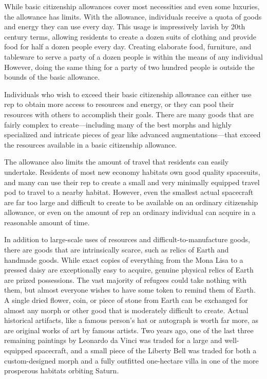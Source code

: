 While basic citizenship allowances cover most necessities
and even some luxuries, the allowance has limits.
With the allowance, individuals receive a quota of 
goods and energy they can use every day. This usage 
is impressively lavish by 20th century terms, allowing 
residents to create a dozen suits of clothing and provide
food for half a dozen people every day. Creating
elaborate food, furniture, and tableware to serve a 
party of a dozen people is within the means of any individual
However, doing the same thing for a party of
two hundred people is outside the bounds of the basic 
allowance.

Individuals who wish to exceed their basic citizenship
allowance can either use rep to obtain more
access to resources and energy, or they can pool 
their resources with others to accomplish their goals. 
There are many goods that are fairly complex to 
create—including many of the best morphs and highly 
specialized and intricate pieces of gear like advanced 
augmentations—that exceed the resources available in 
a basic citizenship allowance.

The allowance also limits the amount of travel that 
residents can easily undertake. Residents of most new 
economy habitats own good quality spacesuits, and 
many can use their rep to create a small and very 
minimally equipped travel pod to travel to a nearby 
habitat. However, even the smallest actual spacecraft 
are far too large and difficult to create to be available 
on an ordinary citizenship allowance, or even on the 
amount of rep an ordinary individual can acquire in a 
reasonable amount of time.

In addition to large-scale uses of resources and 
difficult-to-manufacture goods, there are goods that 
are intrinsically scarce, such as relics of Earth and 
handmade goods. While exact copies of everything 
from the Mona Lisa to a pressed daisy are exceptionally
easy to acquire, genuine physical relics of Earth
are prized possessions. The vast majority of refugees 
could take nothing with them, but almost everyone 
wishes to have some token to remind them of Earth. A 
single dried flower, coin, or piece of stone from Earth 
can be exchanged for almost any morph or other 
good that is moderately difficult to create. Actual 
historical artifacts, like a famous person's hat or autograph
is worth far more, as are original works of
art by famous artists. Two years ago, one of the last 
three remaining paintings by Leonardo da Vinci was 
traded for a large and well-equipped spacecraft, and 
a small piece of the Liberty Bell was traded for both 
a custom-designed morph and a fully outfitted one-hectare
villa in one of the more prosperous habitats
orbiting Saturn.

